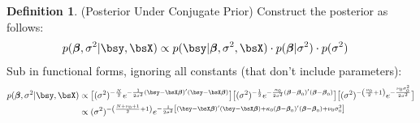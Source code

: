\documentclass[12pt]{article}
\theoremstyle{plain}
\theoremstyle{definition}
\newtheorem{defn}[thm]{Definition}
\theoremstyle{remark}
\newcommand{\bsbeta}{\boldsymbol{\beta}}
\begin{document}
\begin{defn}(Posterior Under Conjugate Prior)
\label{defn:posteriornormal}
Construct the posterior as follows:
\begin{align*}
   p(\bsbeta, \sigma^2 | \bsy,\bsX)
   &\propto
   p(\bsy|\bsbeta,\sigma^2,\bsX)\cdot p(\bsbeta|\sigma^2)\cdot p(\sigma^2)
\end{align*}
Sub in functional forms, ignoring all constants (that don't include
parameters):
\begin{align*}
  p(\bsbeta, \sigma^2 | \bsy,\bsX)
  &\propto
  \big[
  (\sigma^2)^{-\frac{N}{2}}
  e^{-\frac{1}{2\sigma^2}(\bsy-\bsX\bsbeta)'(\bsy-\bsX\bsbeta)}
  \big]
  \big[
  (\sigma^2)^{-\frac{1}{2}}
  e^{-\frac{\kappa_0}{2\sigma^2}(\bsbeta-\bsbeta_0)'(\bsbeta-\bsbeta_0)}
  \big]
  \big[
    (\sigma^2)^{-\left(\frac{\nu_0}{2}+1\right)}
    e^{-\frac{\nu_0\sigma_0^2}{2\sigma^2}}
  \big]
  \\
  &\propto
  (\sigma^2)^{-\left(\frac{N+\nu_0+1}{2}+1\right)}
  e^{%
    -\frac{1}{2\sigma^2}
    \left[
    (\bsy-\bsX\bsbeta)'(\bsy-\bsX\bsbeta)
    + \kappa_0(\bsbeta-\bsbeta_0)'(\bsbeta-\bsbeta_0)
    +\nu_0\sigma^2_0
    \right]
  }
\end{align*}
\end{defn}



\clearpage
\end{document}
